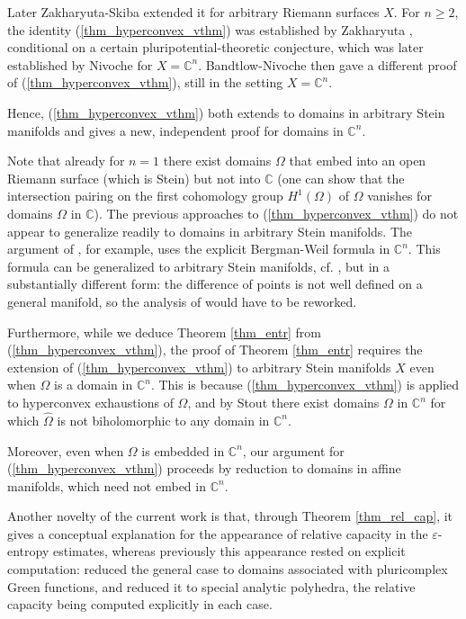 \documentclass[12pt]{article}
\numberwithin{equation}{section}
\theoremstyle{theorem}
\theoremstyle{definition}
\theoremstyle{remark}
\newcommand{\comp}{\mathbb{C}}
\begin{document}
	Later Zakharyuta-Skiba \cite{ZakharyutaSkiba} extended it for arbitrary Riemann surfaces $X$.
	For $n \geq 2$, the identity (\ref{thm_hyperconvex_vthm}) was established by Zakharyuta \cite{ZakharyutaPotential}, conditional on a certain pluripotential-theoretic conjecture, which was later established by Nivoche \cite{NivocheConj} for $X = \comp^n$.
	Bandtlow-Nivoche \cite{BandNivoc} then gave a different proof of (\ref{thm_hyperconvex_vthm}), still in the setting $X = \comp^n$.
	\par 
	Hence, (\ref{thm_hyperconvex_vthm}) both extends \cite{ZakharyutaPotential, NivocheConj, BandNivoc} to domains in arbitrary Stein manifolds and gives a new, independent proof for domains in $\comp^n$.
	\par 
	Note that already for $n = 1$ there exist domains $\Omega$ that embed into an open Riemann surface (which is Stein) but not into $\comp$ (one can show that the intersection pairing on the first cohomology group $H^1(\Omega)$ of $\Omega$ vanishes for domains $\Omega$ in $\comp$).
	The previous approaches to (\ref{thm_hyperconvex_vthm}) do not appear to generalize readily to domains in arbitrary Stein manifolds. 
	The argument of \cite{BandNivoc}, for example, uses the explicit Bergman-Weil formula in $\comp^n$. 
	This formula can be generalized to arbitrary Stein manifolds, cf. \cite[\S 4]{HenkinLeiterer}, but in a substantially different form: the difference of points is not well defined on a general manifold, so the analysis of \cite[Lemma 3.5]{BandNivoc} would have to be reworked.
	\par 
	Furthermore, while we deduce Theorem \ref{thm_entr} from (\ref{thm_hyperconvex_vthm}), the proof of Theorem \ref{thm_entr} requires the extension of (\ref{thm_hyperconvex_vthm}) to arbitrary Stein manifolds $X$ even when $\Omega$ is a domain in $\comp^n$.
	This is because (\ref{thm_hyperconvex_vthm}) is applied to hyperconvex exhaustions of $\widehat{\Omega}$, and by Stout \cite{StoutDomain} there exist domains $\Omega$ in $\comp^n$ for which $\widehat{\Omega}$ is not biholomorphic to any domain in $\comp^n$.
	\par 
	Moreover, even when $\Omega$ is embedded in $\comp^n$, our argument for (\ref{thm_hyperconvex_vthm}) proceeds by reduction to domains in affine manifolds, which need not embed in $\comp^n$.
	\par 
	Another novelty of the current work is that, through Theorem \ref{thm_rel_cap}, it gives a conceptual explanation for the appearance of relative capacity in the $\varepsilon$-entropy estimates, whereas previously this appearance rested on explicit computation: \cite[\S 5, \S 8]{ZakharyutaSurvey} reduced the general case to domains associated with pluricomplex Green functions, and \cite[\S 3.1]{BandNivoc} reduced it to special analytic polyhedra, the relative capacity being computed explicitly in each case.
\end{document}
